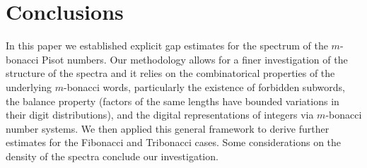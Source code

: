 \documentclass{amsart}
\begin{document}
\section{Conclusions}\label{sec5}
In this paper we established  explicit gap estimates for the spectrum of the  $m$-bonacci Pisot numbers. Our methodology allows for a finer investigation of the structure of the spectra and it relies on the combinatorical properties of the underlying $m$-bonacci words, particularly the existence of forbidden subwords, the balance property (factors of the same lengths have bounded variations in their digit distributions), and the digital representations of integers via $m$-bonacci number systems.  We then applied this general framework to derive further estimates for the Fibonacci and Tribonacci cases. Some considerations on the density of the spectra conclude our investigation. 




\end{document}
